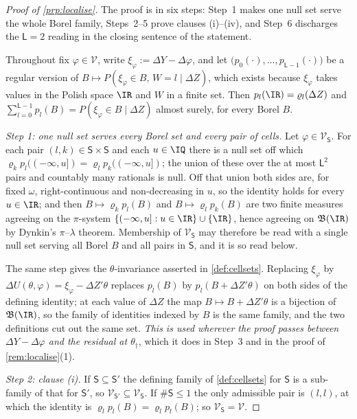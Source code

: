 \begin{proof}[Proof of \cref{prp:localise}]
The proof is in six steps: Step~1 makes one null set serve the whole Borel
family, Steps~2--5 prove clauses (i)--(iv), and Step~6 discharges the
$\mathsf L=2$ reading in the closing sentence of the statement.

Throughout fix $\varphi\in\mathcal V$, write $\xi_\varphi:=\Delta Y-\Delta\varphi$, and let
$\big(p_0(\cdot),\dots,p_{\mathsf L-1}(\cdot)\big)$ be a regular version of
$B\mapsto P(\xi_\varphi\in B,\,W=l\mid\Delta Z)$, which exists because $\xi_\varphi$ takes values in
the Polish space $\IR$ and $W$ in a finite set. Then $p_l(\IR)=\varrho_l(\Delta Z)$ and
$\sum_{l=0}^{\mathsf L-1}p_l(B)=P(\xi_\varphi\in B\mid\Delta Z)$ almost surely, for every Borel $B$.

\emph{Step 1: one null set serves every Borel set and every pair of cells.}
Let $\varphi\in\mathcal V_{\mathsf S}$. For each pair $(l,k)\in\mathsf S\times\mathsf S$ and each
$u\in\IQ$ there is a null set off which
$\varrho_kp_l((-\infty,u])=\varrho_lp_k((-\infty,u])$; the union of these over the at most
$\mathsf L^{2}$ pairs and countably many rationals is null. Off that union both sides are, for fixed
$\omega$, right-continuous and non-decreasing in $u$, so the identity holds for every $u\in\IR$; and
then $B\mapsto\varrho_kp_l(B)$ and $B\mapsto\varrho_lp_k(B)$ are two finite measures agreeing on the
$\pi$-system $\{(-\infty,u]:u\in\IR\}\cup\{\IR\}$, hence agreeing on $\mathfrak B(\IR)$ by Dynkin's
$\pi$--$\lambda$ theorem. Membership of $\mathcal V_{\mathsf S}$ may therefore be read with a single
null set serving all Borel $B$ and all pairs in $\mathsf S$, and it is so read below.

The same step gives the $\theta$-invariance asserted in \cref{def:cellsets}. Replacing
$\xi_\varphi$ by $\Delta U(\theta,\varphi)=\xi_\varphi-\Delta Z'\theta$ replaces $p_l(B)$ by
$p_l(B+\Delta Z'\theta)$ on both sides of the defining identity; at each value of $\Delta Z$ the map
$B\mapsto B+\Delta Z'\theta$ is a bijection of $\mathfrak B(\IR)$, so the family of identities
indexed by $B$ is the same family, and the two definitions cut out the same set. \emph{This is used
wherever the proof passes between $\Delta Y-\Delta\varphi$ and the residual at $\theta_\dagger$},
which it does in Step~3 and in the proof of \cref{rem:localise}\textup{(1)}.

\emph{Step 2: clause \textup{(i)}.} If $\mathsf S\subseteq\mathsf S'$ the defining family of
\cref{def:cellsets} for $\mathsf S$ is a sub-family of that for $\mathsf S'$, so
$\mathcal V_{\mathsf S'}\subseteq\mathcal V_{\mathsf S}$. If $\#\mathsf S\le1$ the only admissible
pair is $(l,l)$, at which the identity is $\varrho_lp_l(B)=\varrho_lp_l(B)$; so
$\mathcal V_{\mathsf S}=\mathcal V$.


\end{proof}
